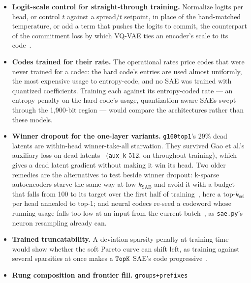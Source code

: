 \begin{itemize}
(Appendix~\ref{sec:support}). The penalty has to act on decoded atoms, or
on direct atoms, which have no decoder. The $k{=}128$ direct runs trained
only at $s_\omega{=}10^{-6}$, too weak to move $\omega$, where on GPT-2 it
takes hold from $10^{-5}$. Output coordinates are not privileged axes, so
a disjoint-coordinate partition there is a strong and somewhat arbitrary
constraint, but it cannot be faked. Concatenated heads remain the only
route to disjoint support.
\item \textbf{Logit-scale control for straight-through training.}
Normalize logits per head, or control $t$ against a spread$/t$ setpoint,
in place of the hand-matched temperature, or add a term that pushes the
logits to commit, the counterpart of the commitment loss by which
VQ-VAE ties an encoder's scale to its code~\cite{vandenoord2017}.
\item \textbf{Codes trained for their rate.} The operational rates price
codes that were never trained for a codec: the hard code's entries are
used almost uniformly, the most expensive usage to entropy-code, and no
SAE was trained with quantized coefficients. Training each against its
entropy-coded rate --- an entropy penalty on the hard code's usage,
quantization-aware SAEs swept through the 1{,}900-bit region --- would
compare the architectures rather than these models.
\item \textbf{Winner dropout for the one-layer variants.} \texttt{g160top1}'s
29\% dead latents are within-head winner-take-all starvation. They
survived Gao et al.'s auxiliary loss on dead latents~\cite{gao2024}
(\texttt{aux\_k} 512, on throughout training), which gives a dead latent
gradient without making it win its head. Two older remedies are the
alternatives to test beside winner dropout: k-sparse autoencoders starve
the same way at low $k_{\mathrm{SAE}}$ and avoid it with a budget that
falls from 100 to its target over the first half of
training~\cite{makhzani2014}, here a top-$k_{\mathrm{sel}}$ per head
annealed to top-1; and neural codecs re-seed a codeword whose running
usage falls too low at an input from the current batch~\cite{zeghidour2021},
as \texttt{sae.py}'s neuron resampling already can.
\item \textbf{Trained truncatability.} A deviation-sparsity penalty at
training time would show whether the soft Pareto curve can shift left,
as training against several sparsities at once makes a $\mathop{\mathtt{TopK}}\limits$ SAE's
code progressive~\cite{gao2024}.
\item \textbf{Rung composition and frontier fill.} \texttt{groups+prefixes}

\end{itemize}
